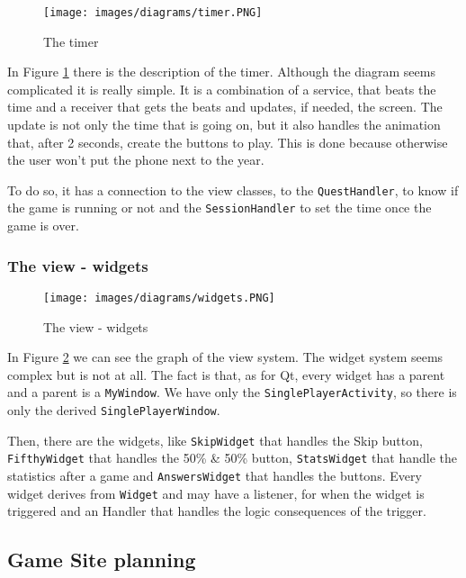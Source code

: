 \begin{figure}[H]
\centering %
\texttt{[image: images/diagrams/timer.PNG]}
\caption{The timer}
\label{fig:timer}
\end{figure}

In Figure \ref{fig:timer} there is the description of the timer. Although the diagram seems complicated it is really simple. It is a combination of a service, that beats the time and a receiver that gets the beats and updates, if needed, the screen. The update is not only the time that is going on, but it also handles the animation that, after  2 seconds, create the buttons to play. This is done because otherwise the user won't put the phone next to the year.

To do so, it has a connection to the view classes, to the \texttt{QuestHandler}, to know if the game is running or not and the \texttt{SessionHandler} to set the time once the game is over.

\subsubsection{The view - widgets}

\begin{figure}[H]
\centering %
\texttt{[image: images/diagrams/widgets.PNG]}
\caption{The view - widgets}
\label{fig:view}
\end{figure}

In Figure \ref{fig:view} we can see the graph of the view system. The widget system seems complex but is not at all. The fact is that, as for Qt, every widget has a parent and a parent is a \texttt{MyWindow}. We have only the \texttt{SinglePlayerActivity}, so there is only the derived \texttt{SinglePlayerWindow}.

Then, there are the widgets, like \texttt{SkipWidget} that handles the Skip button, \\ \texttt{FifthyWidget} that handles the 50\% \& 50\% button, \texttt{StatsWidget} that handle the statistics after a game and \texttt{AnswersWidget} that handles the buttons. Every widget derives from \texttt{Widget} and may have a listener, for when the widget is triggered and an Handler that handles the logic consequences of the trigger.

\subsection{Game Site planning}
\label{sec:planningGameSite}

